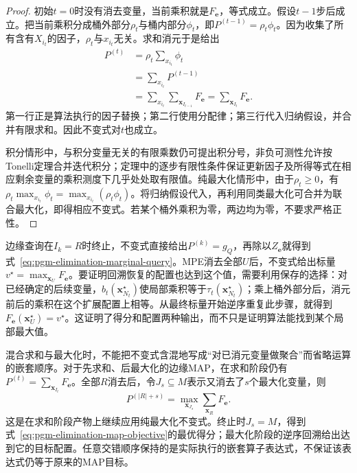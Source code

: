 \begin{proof}
  初始$t=0$时没有消去变量，当前乘积就是$F_{\bm{e}}$，等式成立。假设$t-1$步后成立。把当前乘积分成桶外部分$\rho_t$与桶内部分$\phi_t$，即$P^{(t-1)}=\rho_t\phi_t$。因为收集了所有含有$X_{i_t}$的因子，$\rho_t$与$x_{i_t}$无关。求和消元于是给出
  \[
    \begin{aligned}
      P^{(t)}
      &=\rho_t\sum_{x_{i_t}}\phi_t\\
      &=\sum_{x_{i_t}}P^{(t-1)}\\
      &=\sum_{x_{i_t}}\sum_{\bm{x}_{I_{t-1}}}F_{\bm{e}}
       =\sum_{\bm{x}_{I_t}}F_{\bm{e}}.
    \end{aligned}
  \]
  第一行正是算法执行的因子替换；第二行使用分配律；第三行代入归纳假设，并合并有限求和。因此不变式对$t$也成立。

  积分情形中，与积分变量无关的有限乘数仍可提出积分号，非负可测性允许按Tonelli定理合并迭代积分；定理中的逐步有限性条件保证更新因子及所得等式在相应剩余变量的乘积测度下几乎处处取有限值。纯最大化情形中，由于$\rho_t\geq0$，有$\rho_t\max_{x_{i_t}}\phi_t=\max_{x_{i_t}}(\rho_t\phi_t)$。将归纳假设代入，再利用同类最大化可合并为联合最大化，即得相应不变式。若某个桶外乘积为零，两边均为零，不要求严格正性。
\end{proof}

边缘查询在$I_k=R$时终止，不变式直接给出$P^{(k)}=g_Q$，再除以$Z_{\bm{e}}$就得到式~\eqref{eq:pgm-elimination-marginal-query}。MPE消去全部$U$后，不变式给出标量$v^\star=\max_{\bm{x}_U}F_{\bm{e}}$。要证明回溯恢复的配置也达到这个值，需要利用保存的选择：对已经确定的后续变量，$b_t(\bm{x}_{N_t}^\star)$使局部乘积等于$\tau_t(\bm{x}_{N_t}^\star)$；乘上桶外部分后，消元前后的乘积在这个扩展配置上相等。从最终标量开始逆序重复此步骤，就得到$F_{\bm{e}}(\bm{x}_U^\star)=v^\star$。这证明了得分和配置两种输出，而不只是证明算法能找到某个局部最大值。

混合求和与最大化时，不能把不变式含混地写成“对已消元变量做聚合”而省略运算的嵌套顺序。对于先求和、后最大化的边缘MAP，在求和阶段仍有$P^{(t)}=\sum_{\bm{x}_{I_t}}F_{\bm{e}}$。全部$R$消去后，令$J_s\subseteq M$表示又消去了$s$个最大化变量，则
\begin{equation}
  P^{(|R|+s)}
  =\max_{\bm{x}_{J_s}}\sum_{\bm{x}_R}F_{\bm{e}}.
  \label{eq:pgm-elimination-map-invariant}
\end{equation}
这是在求和阶段产物上继续应用纯最大化不变式。终止时$J_s=M$，得到式~\eqref{eq:pgm-elimination-map-objective}的最优得分；最大化阶段的逆序回溯给出达到它的目标配置。任意交错顺序保持的是实际执行的嵌套算子表达式，不保证该表达式仍等于原来的MAP目标。

